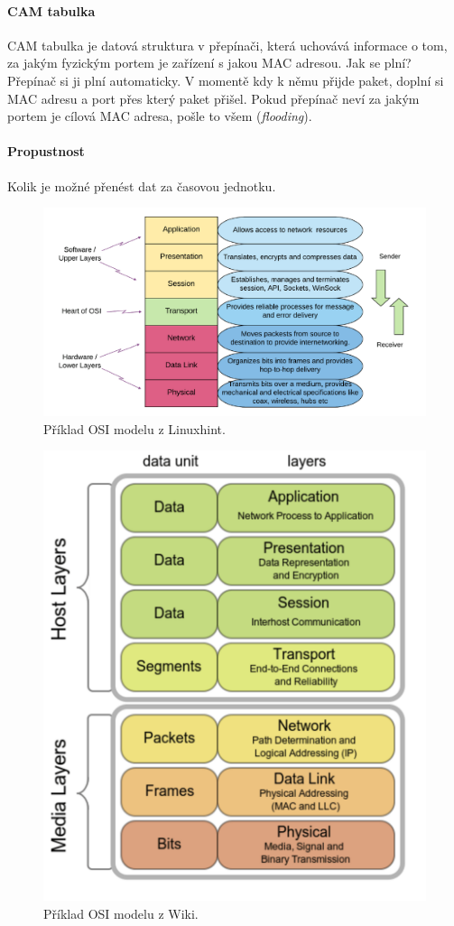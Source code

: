 \paragraph*{CAM tabulka} CAM tabulka je datová struktura v přepínači, která uchovává informace o tom, za jakým fyzickým portem je zařízení s jakou MAC adresou. Jak se plní? Přepínač si ji plní automaticky. V momentě kdy k němu přijde paket, doplní si MAC adresu a port přes který paket přišel. Pokud přepínač neví za jakým portem je cílová MAC adresa, pošle to všem (\textit{flooding}).

\paragraph*{Propustnost} Kolik je možné přenést dat za časovou jednotku.

\begin{figure}[H]
    \centering
    \includegraphics[width=1\linewidth]{osi_model_linuxhint.pdf}
    \caption{Příklad OSI modelu z Linuxhint.}
\end{figure}

\begin{figure}[H]
    \centering
    \includegraphics[width=0.65\linewidth]{osi_model_wiki.pdf}
    \caption{Příklad OSI modelu z Wiki.}
\end{figure}


